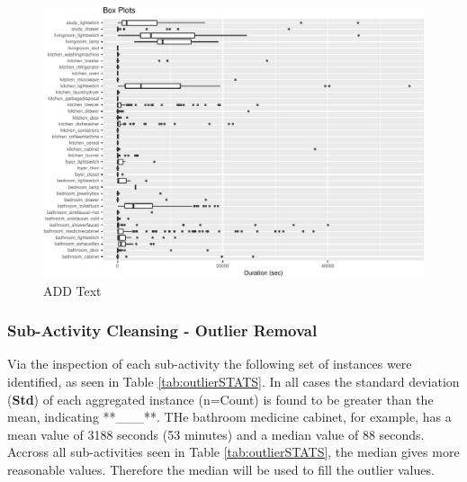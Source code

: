 \documentclass[11pt,]{article}
\begin{document}
\begin{figure}[H]

{\centering \includegraphics{MD_Final_files/figure-latex/FIG_allBoxPlots-1} 

}

\caption{ADD Text}\label{fig:FIG_allBoxPlots}
\end{figure}

\pagebreak

\hypertarget{sub-activity-cleansing---outlier-removal}{%
\subsubsection{Sub-Activity Cleansing - Outlier
Removal}\label{sub-activity-cleansing---outlier-removal}}

Via the inspection of each sub-activity the following set of instances
were identified, as seen in Table \ref{tab:outlierSTATS}. In all cases
the standard deviation (\textbf{Std}) of each aggregated instance
(n=Count) is found to be greater than the mean, indicating **\_\_\_**.
THe bathroom medicine cabinet, for example, has a mean value of 3188
seconds (53 minutes) and a median value of 88 seconds. Accross all
sub-activities seen in Table \ref{tab:outlierSTATS}, the median gives
more reasonable values. Therefore the median will be used to fill the
outlier values.
\end{document}
